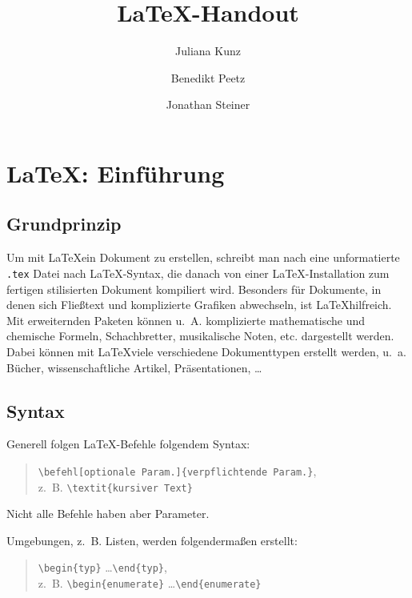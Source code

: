 \documentclass[ngerman]{scrreport}
\title{\LaTeX{}-Handout}
\author{Juliana Kunz \and Benedikt Peetz \and Jonathan Steiner}
\date{}
\begin{document}
\maketitle

\tableofcontents

\chapter{\centering\LaTeX: Einführung}

\section{Grundprinzip}
Um mit \LaTeX ein Dokument zu erstellen, schreibt man nach eine unformatierte \texttt{.tex} Datei nach \LaTeX-Syntax, die danach von einer \LaTeX-Installation zum fertigen stilisierten Dokument kompiliert wird.
Besonders für Dokumente, in denen sich Fließtext und komplizierte Grafiken abwechseln, ist \LaTeX hilfreich. Mit erweiternden Paketen können u.~A. komplizierte mathematische und chemische Formeln, Schachbretter, musikalische Noten, etc. dargestellt werden.
Dabei können mit \LaTeX viele verschiedene Dokumenttypen erstellt werden, u.~a. Bücher, wissenschaftliche Artikel, Präsentationen, \dots

\section{Syntax}

Generell folgen \LaTeX-Befehle folgendem Syntax:

\color{blue}
\begin{quote}
	\verb|\befehl[optionale Param.]{verpflichtende Param.}|{\color{black}, \\z.~B.} \verb|\textit{kursiver Text}|
\end{quote}
\color{black}
Nicht alle Befehle haben aber Parameter.

Umgebungen, z.~B. Listen, werden folgendermaßen erstellt:

\color{blue}
\begin{quote}
	\verb|\begin{typ}| \dots \verb|\end{typ}|{\color{black}, \\z.~B.} \verb|\begin{enumerate}| \dots \verb|\end{enumerate}|
\end{quote}
\color{black}
\end{document}
